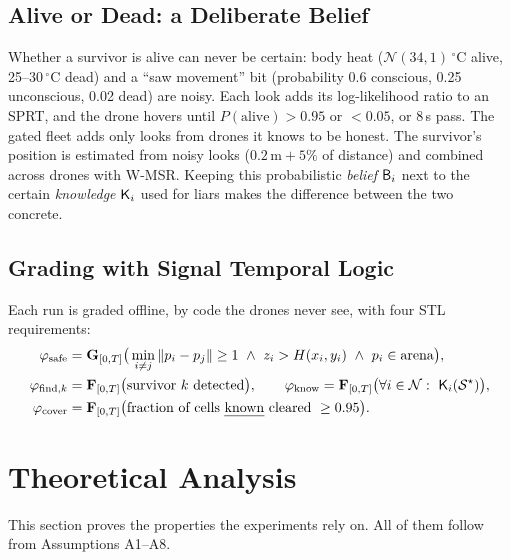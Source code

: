 \subsection{Alive or Dead: a Deliberate Belief}

Whether a survivor is alive can never be certain: body heat ($\mathcal{N}(34,1)$\,$^\circ$C alive, 25--30\,$^\circ$C
dead) and a ``saw movement'' bit (probability 0.6 conscious, 0.25 unconscious, 0.02 dead) are noisy. Each look adds its
log-likelihood ratio to an SPRT, and the drone hovers until $P(\text{alive})>0.95$ or $<0.05$, or 8\,s pass. The
gated fleet adds only looks from drones it knows to be honest. The survivor's position is estimated from noisy looks
($0.2\,\mathrm{m}+5\%$ of distance) and combined across drones with W-MSR. Keeping this probabilistic \emph{belief}
$\mathsf{B}_i$ next to the certain \emph{knowledge} $\mathsf{K}_i$ used for liars makes the difference between the two concrete.

\subsection{Grading with Signal Temporal Logic}
\label{sec:stl}

Each run is graded offline, by code the drones never see, with four STL requirements:
\begin{align}
    \varphi_{\mathrm{safe}}  &= \mathbf{G}_{[0,T]}\big(\min_{i\neq j}\|p_i-p_j\|\ge 1\ \wedge\ z_i > H(x_i,y_i)\ \wedge\ p_i\in\text{arena}\big),\\
    \varphi_{\mathrm{find},k}&= \mathbf{F}_{[0,T]}\big(\text{survivor }k\text{ detected}\big),\qquad
    \varphi_{\mathrm{know}}   = \mathbf{F}_{[0,T]}\big(\forall i\in\mathcal{N}:\ \Kn_i(\mathcal{S}^\star)\big),\\
    \varphi_{\mathrm{cover}} &= \mathbf{F}_{[0,T]}\big(\text{fraction of cells \emph{known} cleared}\ \ge 0.95\big).
\end{align}

\section{Theoretical Analysis}
\label{sec:theory}

This section proves the properties the experiments rely on. All of them follow from Assumptions A1--A8.

